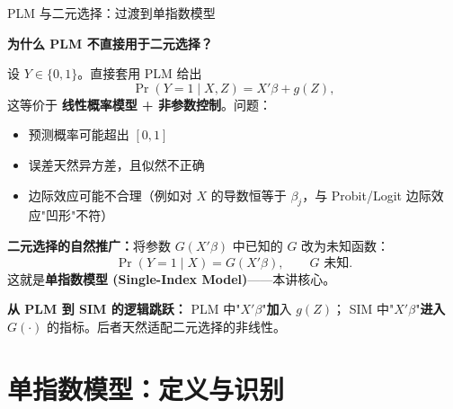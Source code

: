 \documentclass[aspectratio=169, 10pt]{beamer}
\begin{document}
\begin{frame}{PLM 与二元选择：过渡到单指数模型}

  \textbf{为什么 PLM 不直接用于二元选择？}

  \vspace{0.3em}
  设 $Y \in \{0, 1\}$。直接套用 PLM 给出
  $$\Pr(Y=1\mid X, Z) = X'\beta + g(Z),$$
  这等价于 \textbf{线性概率模型 + 非参数控制}。问题：
  \begin{itemize}\setlength{\itemsep}{1pt}
    \item 预测概率可能超出 $[0,1]$
    \item 误差天然异方差，且似然不正确
    \item 边际效应可能不合理（例如对 $X$ 的导数恒等于 $\beta_j$，与 Probit/Logit 边际效应"凹形"不符）
  \end{itemize}

  \begin{keybox}
    \textbf{二元选择的自然推广：}将参数 $G(X'\beta)$ 中已知的 $G$ 改为未知函数：
    $$\boxed{\;\Pr(Y=1\mid X) = G(X'\beta), \qquad G \text{ 未知}.\;}$$
    这就是\textbf{单指数模型 (Single-Index Model)}——本讲核心。
  \end{keybox}

  \textbf{从 PLM 到 SIM 的逻辑跳跃：}
  PLM 中"$X'\beta$"\textbf{加}入 $g(Z)$；
  SIM 中"$X'\beta$"\textbf{进入} $G(\cdot)$ 的指标。后者天然适配二元选择的非线性。

\end{frame}

\section{单指数模型：定义与识别}
\end{document}
